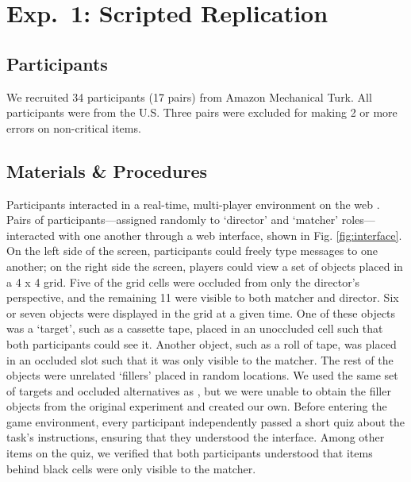 \documentclass[10pt,letterpaper]{article}
\begin{document}
\section{Exp.~1: Scripted Replication}
\label{sec:Exp1}

\subsection{Participants}

We recruited 34 participants (17 pairs) from Amazon Mechanical Turk. All participants were from the U.S. Three pairs were excluded for making 2 or more errors on non-critical items.

\subsection{Materials \& Procedures}


Participants interacted in a real-time, multi-player environment on the web \cite{Hawkins15_RealTimeWebExperiments}. 
Pairs of participants---assigned randomly to `director' and `matcher' roles---interacted with one another through a web interface, shown in Fig. \ref{fig:interface}. On the left side of the screen, participants could freely type messages to one another; on the right side the screen, players could view a set of objects placed in a 4 x 4 grid. Five of the grid cells were occluded from only the director's perspective, and the remaining 11 were visible to both matcher and director. Six or seven objects were displayed in the grid at a given time. One of these objects was a `target', such as a cassette tape, placed in an unoccluded cell such that both participants could see it. Another object, such as a roll of tape, was placed in an occluded slot such that it was only visible to the matcher. The rest of the objects were unrelated `fillers' placed in random locations. We used the same set of targets and occluded alternatives as , but we were unable to obtain the filler objects from the original experiment and created our own.
Before entering the game environment, every participant independently passed a short quiz about the task's instructions, ensuring that they understood the interface. Among other items on the quiz, we verified that both participants understood that items behind black cells were only visible to the matcher. 
\end{document}
